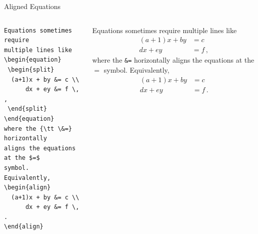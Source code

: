 \documentclass[aspectratio=1610]{beamer}
\begin{document}
\begin{frame}[fragile]{Aligned Equations}
  \begin{columns}[T]
      \begin{lstlisting}
Equations sometimes require
multiple lines like
\begin{equation}
 \begin{split}
  (a+1)x + by &= c \\
      dx + ey &= f \, ,
 \end{split}
\end{equation}
where the {\tt \&=} horizontally
aligns the equations at the $=$
symbol.  Equivalently,
\begin{align}
  (a+1)x + by &= c \\
      dx + ey &= f \, .
\end{align}
      \end{lstlisting}
Equations sometimes require
multiple lines like
\begin{equation}
 \begin{split}
  (a+1)x + by &= c \\
      dx + ey &= f \, ,
 \end{split}
\end{equation}
where the {\tt \&=} horizontally
aligns the equations at the $=$
symbol.  Equivalently,
\begin{align}
  (a+1)x + by &= c \\
      dx + ey &= f \, .
\end{align}
  \end{columns}
\end{frame}
\end{document}
